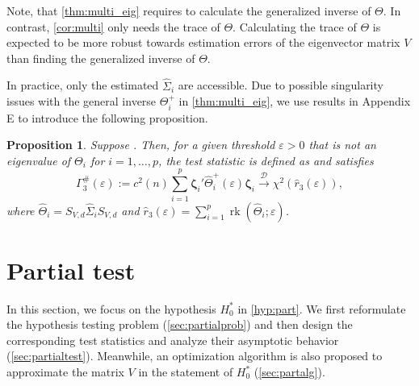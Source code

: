 \documentclass[12pt]{article}
\numberwithin{thm}{section}
\numberwithin{defn}{section}
\numberwithin{lem}{section}
\newtheorem{prop}{Proposition}
\numberwithin{prop}{section}
\numberwithin{cor}{section}
\numberwithin{rem}{section}
\newcommand{\rank}{\operatorname{rk}}
\begin{document}
Note, that \autoref{thm:multi_eig} requires to calculate the generalized inverse of $\Theta$.
In contrast, \autoref{cor:multi} only needs the trace of $\Theta$. Calculating the trace of $\Theta$ is expected to be more robust towards estimation errors of the eigenvector matrix $V$ than finding the generalized inverse of $\Theta$.

In practice, only the estimated $\widehat{\Sigma}_i$ are accessible. Due to possible singularity issues with the general inverse $\Theta_i^+$ in \autoref{thm:multi_eig}, we use results in {\color{cyan} Appendix E} to introduce the following proposition.

\begin{prop}\label{thm:multi_eig.Est}
Suppose . Then, for a given threshold $\varepsilon > 0$ that is not an eigenvalue of $\Theta_i$ for $i = 1, \dots, p$, 
the test statistic is defined as and satisfies
\begin{equation}\label{eq:gamma3.est}
    \Gamma_3^\#(\varepsilon) := c^2(n) \sum_{i = 1}^p \bm{\zeta}_i' \widehat{\Theta}_i^+(\varepsilon) \bm{\zeta}_i \xrightarrow{\mathcal{D}} \chi^2(\widehat{r}_3(\varepsilon)),
\end{equation}
where $\widehat{\Theta}_i = S_{V, d} \widehat{\Sigma}_i S_{V, d}$ and $\widehat{r}_3(\varepsilon) = \sum_{i=1}^p \rank(\widehat{\Theta}_i; \varepsilon)$.%
\end{prop}

\vspace{-0.5cm}
\section{Partial test}\label{sec:part}
\vspace{-0.3cm}
In this section, we focus on the hypothesis $H_0^{*}$ in \eqref{hyp:part}. We first reformulate the hypothesis testing problem (\autoref{sec:partialprob}) and then design the corresponding test statistics and analyze their asymptotic behavior (\autoref{sec:partialtest}). Meanwhile, an optimization algorithm is also proposed to approximate the matrix $V$ in the statement of $H_0^{*}$ (\autoref{sec:partalg}).

\vspace{-0.5cm}
\end{document}

